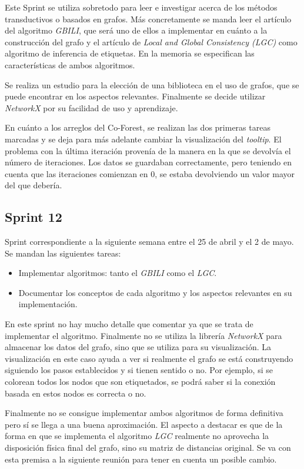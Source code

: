 Este Sprint se utiliza sobretodo para leer e investigar acerca de los métodos transductivos o basados en grafos. Más concretamente se manda leer el artículo del algoritmo \textit{GBILI}, que será uno de ellos a implementar en cuánto a la construcción del grafo y el artículo de \textit{Local and Global Consistency (LGC)} como algoritmo de inferencia de etiquetas. En la memoria se especifican las características de ambos algoritmos.
 
Se realiza un estudio para la elección de una biblioteca en el uso de grafos, que se puede encontrar en los aspectos relevantes. Finalmente se decide utilizar \textit{NetworkX} por su facilidad de uso y aprendizaje.

En cuánto a los arreglos del Co-Forest, se realizan las dos primeras tareas marcadas y se deja para más adelante cambiar la visualización del \textit{tooltip}. El problema con la última iteración provenía de la manera en la que se devolvía el número de iteraciones. Los datos se guardaban correctamente, pero teniendo en cuenta que las iteraciones comienzan en 0, se estaba devolviendo un valor mayor del que debería. 

\subsection{Sprint 12}
Sprint correspondiente a la siguiente semana entre el 25 de abril y el 2 de mayo. Se mandan las siguientes tareas:
\begin{itemize}
	\item Implementar algoritmos: tanto el \textit{GBILI} como el \textit{LGC}.
	\item Documentar los conceptos de cada algoritmo y los aspectos relevantes en su implementación.
\end{itemize}

En este sprint no hay mucho detalle que comentar ya que se trata de implementar el algoritmo. Finalmente no se utiliza la librería \textit{NetworkX} para almacenar los datos del grafo, sino que se utiliza para su visualización. La visualización en este caso ayuda a ver si realmente el grafo se está construyendo siguiendo los pasos establecidos y si tienen sentido o no. Por ejemplo, si se colorean todos los nodos que son etiquetados, se podrá saber si la conexión basada en estos nodos es correcta o no.

Finalmente no se consigue implementar ambos algoritmos de forma definitiva pero sí se llega a una buena aproximación. El aspecto a destacar es que de la forma en que se implementa el algoritmo \textit{LGC} realmente no aprovecha la disposición física final del grafo, sino su matriz de distancias original. Se va con esta premisa a la siguiente reunión para tener en cuenta un posible cambio.


